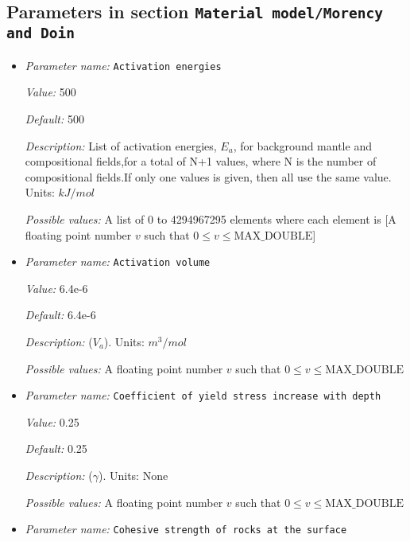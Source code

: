 \subsection{Parameters in section \tt Material model/Morency and Doin}
\label{parameters:Material_20model/Morency_20and_20Doin}

\begin{itemize}
\item {\it Parameter name:} {\tt Activation energies}
\label{parameters:Material model/Morency and Doin/Activation energies}


{\it Value:} 500


{\it Default:} 500


{\it Description:} List of activation energies, $E_a$, for background mantle and compositional fields,for a total of N+1 values, where N is the number of compositional fields.If only one values is given, then all use the same value.  Units: $kJ / mol$


{\it Possible values:} A list of 0 to 4294967295 elements where each element is [A floating point number $v$ such that $0 \leq v \leq \text{MAX\_DOUBLE}$]
\item {\it Parameter name:} {\tt Activation volume}
\label{parameters:Material model/Morency and Doin/Activation volume}


{\it Value:} 6.4e-6


{\it Default:} 6.4e-6


{\it Description:} ($V_a$). Units: $m^3 / mol$


{\it Possible values:} A floating point number $v$ such that $0 \leq v \leq \text{MAX\_DOUBLE}$
\item {\it Parameter name:} {\tt Coefficient of yield stress increase with depth}
\label{parameters:Material model/Morency and Doin/Coefficient of yield stress increase with depth}


{\it Value:} 0.25


{\it Default:} 0.25


{\it Description:} ($\gamma$). Units: None


{\it Possible values:} A floating point number $v$ such that $0 \leq v \leq \text{MAX\_DOUBLE}$
\item {\it Parameter name:} {\tt Cohesive strength of rocks at the surface}
\label{parameters:Material model/Morency and Doin/Cohesive strength of rocks at the surface}



\end{itemize}
